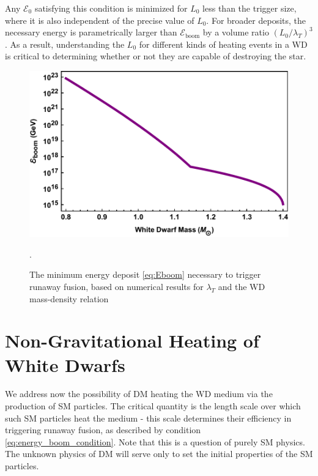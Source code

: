 \documentclass[twocolumn, preprintnumbers,amsmath,amssymb,prd, superscriptaddress]{revtex4}
\newcommand{\Ez}{\mathcal{E}_0}
\newcommand{\Eboom}{\mathcal{E}_\text{boom}}
\begin{document}
Any $\Ez$ satisfying this condition is minimized for $L_0$ less than the trigger size, where it is also independent of the precise value of $L_0$.
For broader deposits, the necessary energy is parametrically larger than $\Eboom$ by a volume ratio $(L_0/\lambda_T)^3$.
As a result, understanding the $L_0$ for different kinds of heating events in a WD is critical to determining whether or not they are capable of destroying the star.
\begin{figure}
\includegraphics[scale=.45]{Eboom.pdf}
\caption{The minimum energy deposit \eqref{eq:Eboom} necessary to trigger runaway fusion, based on numerical results for $\lambda_T$ \cite{Woosley} and the WD mass-density relation \cite{cococubed}}.
\label{fig:Eboom}
\end{figure}

\section{Non-Gravitational Heating of White Dwarfs}
\label{sec:SMHeating}

We address now the possibility of DM heating the WD medium via the production of SM particles. 
The critical quantity is the length scale over which such SM particles heat the medium - this scale determines their efficiency in triggering runaway fusion, as described by condition \eqref{eq:energy_boom_condition}.
Note that this is a question of purely SM physics. 
The unknown physics of DM will serve only to set the initial properties of the SM particles.
\end{document}
